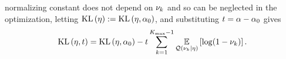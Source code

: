 \begin{ex}
normalizing constant does not depend on $\nu_{k}$ and so can be neglected in the
optimization, letting $\mathrm{KL}\left(\eta\right) := \mathrm{KL}\left(\eta, \alpha_0\right)$, and substituting $t =
\alpha - \alpha_0$ gives
%
\begin{align*}
%
\KL{\eta, \t} = \KL{\eta, \alpha_0}
-\t \sum_{\k=1}^{\kmax - 1}
    \expect{\q(\nuk \vert \eta)}{\log (1 - \nuk)}.
%
\end{align*}
%
%
\end{ex}



